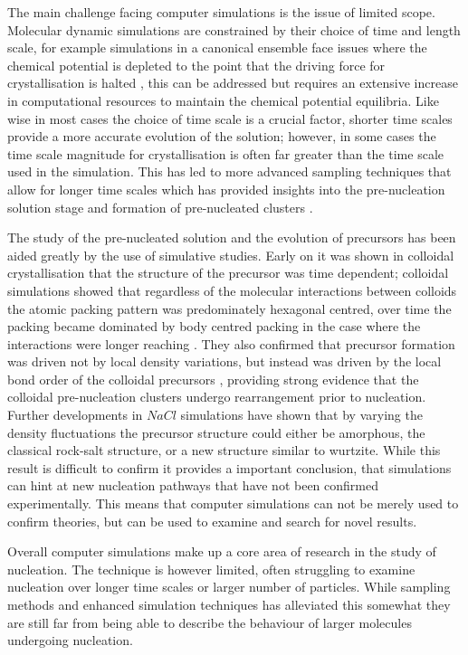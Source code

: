 The main challenge facing computer simulations is the issue
of limited scope. Molecular dynamic simulations are constrained
by their choice of time and length scale, for example simulations
in a canonical ensemble face issues where the chemical potential
is depleted to the point that the driving force for crystallisation
is halted \cite{DuranOlivencia2015, Finney2023}, this can be 
addressed but requires an extensive increase in computational 
resources to maintain the chemical potential equilibria. Like wise
in most cases the choice of time scale is a crucial factor, shorter
time scales provide a more accurate evolution of the solution; 
however, in some cases the time scale magnitude for crystallisation
is often far greater than the time scale used in the simulation. This
has led to more advanced sampling techniques that allow for longer 
time scales which has provided insights into the pre-nucleation 
solution stage and formation of pre-nucleated clusters \cite{Finney2023}.
 
The study of the pre-nucleated solution and the evolution of 
precursors has been aided greatly by the use of simulative 
studies. Early on it was shown in colloidal crystallisation 
that the structure of the precursor was time dependent; 
colloidal simulations showed that regardless of the molecular
interactions between colloids the atomic packing pattern was 
predominately hexagonal centred, over time the packing
became dominated by body centred packing in the case 
where the interactions were longer reaching \cite{Tan2013}. 
They also confirmed that precursor formation was driven not
by local density variations, but instead was driven by the 
local bond order of the colloidal precursors \cite{Tan2013}, 
providing strong evidence that the colloidal pre-nucleation 
clusters undergo rearrangement prior to nucleation. Further
developments in $NaCl$ simulations have shown that by varying
the density fluctuations the precursor structure could either
be amorphous, the classical rock-salt structure, or a new 
structure similar to wurtzite. While this result is difficult
to confirm it provides a important conclusion, that simulations
can hint at new nucleation pathways that have not been confirmed
experimentally. This means that computer simulations can not
be merely used to confirm theories, but can be used to examine
and search for novel results. 

Overall computer simulations make up a core area of research 
in the study of nucleation. The technique is however limited,
often struggling to examine nucleation over longer time scales
or larger number of particles. While sampling methods and 
enhanced simulation techniques has alleviated this somewhat 
they are still far from being able to describe the behaviour 
of larger molecules undergoing nucleation. 


